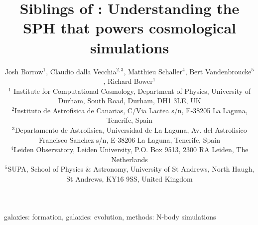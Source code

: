 \documentclass[fleqn,usenatbib]{mnras}
\title{Siblings of \anarchy{}: Understanding the SPH that powers cosmological simulations}
\author[Borrow et al.]{
Josh Borrow$^{1}$,
Claudio dalla Vecchia$^{2, 3}$,
Matthieu Schaller$^{4}$,
Bert Vandenbroucke$^{5}$, \newauthor
Richard Bower$^{1}$
\\$^1$ Institute for Computational Cosmology, Department of Physics, University of Durham, South Road, Durham, DH1 3LE, UK
\\$^2$Instituto de Astrofisica de Canarias, C/Via Lactea s/n, E-38205 La Laguna, Tenerife, Spain
\\$^3$Departamento de Astrofisica, Universidad de La Laguna, Av. del Astrofisico Francisco Sanchez s/n, E-38206 La Laguna, Tenerife, Spain
\\$^4$Leiden Observatory, Leiden University, P.O. Box 9513, 2300 RA Leiden, The Netherlands
\\$^5$SUPA, School of Physics \& Astronomy, University of St Andrews, North Haugh, St Andrews, KY16 9SS, United Kingdom
}
\begin{document}
\maketitle

\begin{abstract}\end{abstract}

\begin{keywords}galaxies: formation, galaxies: evolution, methods: N-body simulations\end{keywords}
















\end{document}
